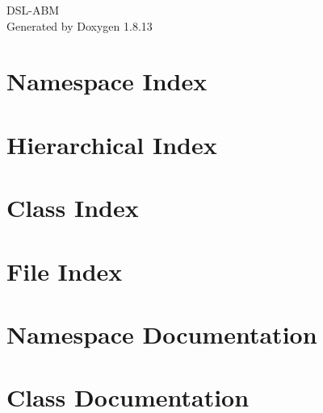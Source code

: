 \documentclass[twoside]{book}
\newcommand{\+}{\discretionary{\mbox{\scriptsize$\hookleftarrow$}}{}{}}
\newcommand{\clearemptydoublepage}{%
  \newpage{\pagestyle{empty}\cleardoublepage}%
}
\begin{document}
\hypersetup{pageanchor=false,
             bookmarksnumbered=true,
             pdfencoding=unicode
            }
\begin{titlepage}
\vspace*{7cm}
\begin{center}%
{\Large D\+S\+L-\/\+A\+BM }\\
\vspace*{1cm}
{\large Generated by Doxygen 1.8.13}\\
\end{center}
\end{titlepage}
\clearemptydoublepage
{}
\tableofcontents
\clearemptydoublepage
{}
\hypersetup{pageanchor=true}

\chapter{Namespace Index}

\chapter{Hierarchical Index}

\chapter{Class Index}

\chapter{File Index}

\chapter{Namespace Documentation}

















\chapter{Class Documentation}


























\end{document}
